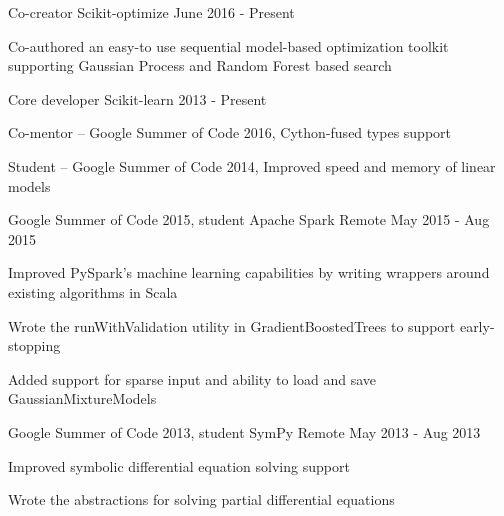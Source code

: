 \begin{cventries}
  \cventry
    {Co-creator}
    {Scikit-optimize}
    {}
    {June 2016 - Present}
    {
      \begin{cvitems}
        \item {Co-authored an easy-to use sequential model-based optimization toolkit supporting Gaussian Process and Random Forest based search}
      \end{cvitems}
    }
  \cventry
    {Core developer}
    {Scikit-learn}
    {}
    {2013 - Present}
    {
      \begin{cvitems}
        \item {Co-mentor -- Google Summer of Code 2016, Cython-fused types support}
        \item {Student -- Google Summer of Code 2014, Improved speed and memory of linear models}
      \end{cvitems}
    }
  \cventry
    {Google Summer of Code 2015, student}
    {Apache Spark}
    {Remote}
    {May 2015 - Aug 2015}
    {
      \begin{cvitems}
        \item {Improved PySpark's machine learning capabilities by writing wrappers around existing algorithms in Scala}
        \item{Wrote the runWithValidation utility in GradientBoostedTrees to support early-stopping}
        \item{Added support for sparse input and ability to load and save GaussianMixtureModels}
      \end{cvitems}
    }
  \cventry
    {Google Summer of Code 2013, student}
    {SymPy}
    {Remote}
    {May 2013 - Aug 2013}
    {
      \begin{cvitems}
        \item {Improved symbolic differential equation solving support}
        \item {Wrote the abstractions for solving partial differential equations}
      \end{cvitems}
    }
\end{cventries}